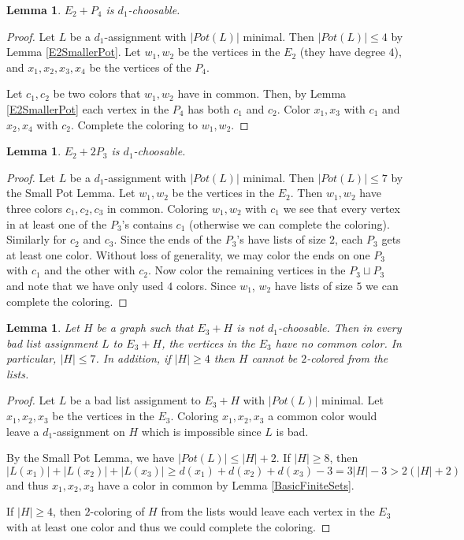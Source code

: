 \documentclass[12pt]{article}
\theoremstyle{plain}
\newtheorem{lem}[thm]{Lemma}
\theoremstyle{definition}
\theoremstyle{remark}
\begin{document}
\begin{lem}\label{E2PlusP4}
$E_2 + P_4$ is $d_1$-choosable.
\end{lem}
\begin{proof}
Let $L$ be a $d_1$-assignment with $|Pot(L)|$ minimal. Then $|Pot(L)| \leq 4$ by Lemma \ref{E2SmallerPot}. Let $w_1, w_2$ be the vertices in the $E_2$ (they have degree $4$), and $x_1, x_2, x_3, x_4$ be the vertices of the $P_4$.\newline

Let $c_1, c_2$ be two colors that $w_1, w_2$ have in common.  Then, by Lemma \ref{E2SmallerPot} each vertex in the $P_4$ has both $c_1$ and $c_2$.  Color $x_1, x_3$ with $c_1$ and $x_2, x_4$ with $c_2$.  Complete the coloring to $w_1, w_2$.
\end{proof}

\begin{lem}\label{E2Plus2P3}
$E_2 + 2P_3$ is $d_1$-choosable.
\end{lem}
\begin{proof}
Let $L$ be a $d_1$-assignment with $|Pot(L)|$ minimal. Then $|Pot(L)| \leq 7$ by the Small Pot Lemma.  Let $w_1, w_2$ be the vertices in the $E_2$.  Then $w_1, w_2$ have three colors $c_1, c_2, c_3$ in common.  Coloring $w_1, w_2$ with $c_1$ we see that every vertex in at least one of the $P_3$'s contains $c_1$ (otherwise we can complete the coloring).  Similarly for $c_2$ and $c_3$.  Since the ends of the $P_3$'s have lists of size $2$, each $P_3$ gets at least one color.  Without loss of generality, we may color the ends on one $P_3$ with $c_1$ and the other with $c_2$.  Now color the remaining vertices in the $P_3 \sqcup P_3$ and note that we have only used $4$ colors.  Since $w_1$, $w_2$ have lists of size $5$ we can complete the coloring.
\end{proof}

\begin{lem}\label{E3NoCommon}
Let $H$ be a graph such that $E_3 + H$ is not $d_1$-choosable.  Then in every bad list assignment $L$ to $E_3 + H$, the vertices in the $E_3$ have no common color.  In particular, $|H| \leq 7$.  In addition, if $|H| \geq 4$ then $H$ cannot be $2$-colored from the lists.
\end{lem}
\begin{proof}
Let $L$ be a bad list assignment to $E_3 + H$ with $|Pot(L)|$ minimal. Let $x_1, x_2, x_3$ be the vertices in the $E_3$. Coloring $x_1, x_2, x_3$ a common color would leave a $d_1$-assignment on $H$ which is impossible since $L$ is bad.\newline

By the Small Pot Lemma, we have $|Pot(L)| \leq |H| + 2$.  If $|H| \geq 8$, then $|L(x_1)| + |L(x_2)| + |L(x_3)| \geq d(x_1) + d(x_2) + d(x_3) - 3 = 3|H| - 3 > 2(|H| + 2)$ and thus $x_1, x_2, x_3$ have a color in common by Lemma \ref{BasicFiniteSets}.\newline

If $|H| \geq 4$, then $2$-coloring of $H$ from the lists would leave each vertex in the $E_3$ with at least one color and thus we could complete the coloring.
\end{proof}
\end{document}
